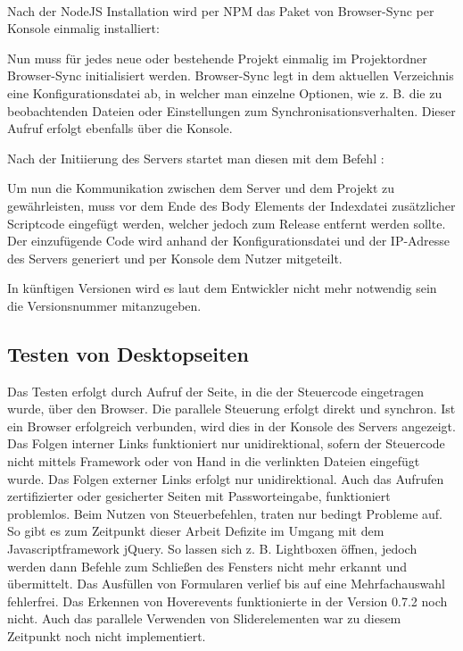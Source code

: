 	\\Nach der \Gls{NodeJS} Installation wird per \Gls{NPM} das Paket von Browser-Sync per Konsole einmalig installiert:
	
	Nun muss für jedes neue oder bestehende Projekt einmalig im Projektordner Browser-Sync initialisiert werden. Browser-Sync legt in dem aktuellen Verzeichnis eine Konfigurationsdatei ab, in welcher man einzelne Optionen, wie z. B. die zu beobachtenden Dateien oder Einstellungen zum Synchronisationsverhalten. Dieser Aufruf erfolgt ebenfalls über die Konsole.
	
	Nach der Initiierung des Servers startet man diesen mit dem Befehl :
	
	Um nun die Kommunikation zwischen dem Server und dem Projekt zu gewährleisten, muss vor dem Ende des Body Elements der Indexdatei zusätzlicher Scriptcode eingefügt werden, welcher jedoch zum Release entfernt werden sollte. Der einzufügende Code  wird anhand der Konfigurationsdatei und der IP-Adresse des Servers generiert und per Konsole dem Nutzer mitgeteilt.
	
	In künftigen Versionen wird es laut dem Entwickler nicht mehr notwendig sein die Versionsnummer mitanzugeben.
	
	\subsection{Testen von Desktopseiten}
	Das Testen erfolgt durch Aufruf der Seite, in die der Steuercode eingetragen wurde, über den Browser. Die parallele Steuerung erfolgt direkt und synchron. Ist ein Browser erfolgreich verbunden, wird dies in der Konsole des Servers angezeigt.
	Das Folgen interner Links funktioniert nur unidirektional, sofern der Steuercode nicht mittels \Gls{Framework} oder von Hand in die verlinkten Dateien eingefügt wurde. Das Folgen externer Links erfolgt nur unidirektional. Auch das Aufrufen zertifizierter oder \Gls{gesichert}er Seiten mit Passworteingabe, funktioniert problemlos. Beim Nutzen von Steuerbefehlen, traten nur bedingt Probleme auf. So gibt es zum Zeitpunkt dieser Arbeit Defizite im Umgang mit dem \Gls{Javascript}framework jQuery. So lassen sich z. B. Lightboxen öffnen, jedoch werden dann Befehle zum \mbox{Schließen} des Fensters nicht mehr erkannt und übermittelt. Das Ausfüllen von Formularen verlief bis auf eine Mehrfachauswahl fehlerfrei. Das Erkennen von Hoverevents funktionierte in der Version 0.7.2 noch nicht. Auch das parallele Verwenden von Sliderelementen war zu diesem Zeitpunkt noch nicht implementiert.
	
